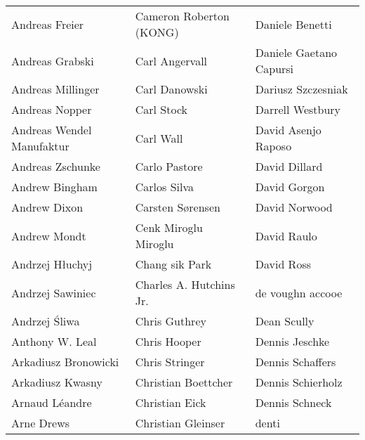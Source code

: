 \begin{tabular}{p{4.5cm}p{4.5cm}p{4.5cm}}
Andreas Freier & Cameron Roberton (KONG) & Daniele Benetti \\
Andreas Grabski & Carl Angervall & Daniele Gaetano Capursi \\
Andreas Millinger & Carl Danowski & Dariusz Szczesniak \\
Andreas Nopper & Carl Stock & Darrell Westbury \\
Andreas Wendel Manufaktur & Carl Wall & David Asenjo Raposo \\
Andreas Zschunke & Carlo Pastore & David Dillard \\
Andrew Bingham & Carlos Silva & David Gorgon \\
Andrew Dixon & Carsten Sørensen & David Norwood \\
Andrew Mondt & Cenk Miroglu Miroglu & David Raulo \\
Andrzej Hłuchyj & Chang sik Park & David Ross \\
Andrzej Sawiniec & Charles A. Hutchins Jr. & de voughn accooe \\
Andrzej Śliwa & Chris Guthrey & Dean Scully \\
Anthony W. Leal & Chris Hooper & Dennis Jeschke \\
Arkadiusz Bronowicki & Chris Stringer & Dennis Schaffers \\
Arkadiusz Kwasny & Christian Boettcher & Dennis Schierholz \\
Arnaud Léandre & Christian Eick & Dennis Schneck \\
Arne Drews & Christian Gleinser & denti \\
\end{tabular}
\newpage
\setlength{\tabcolsep}{1mm}

